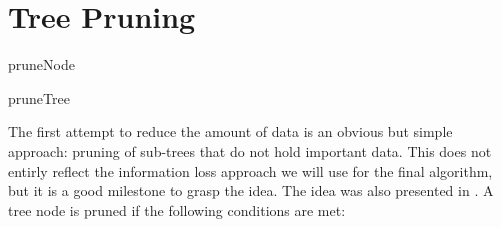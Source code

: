 \section{Tree Pruning}
\label{sec:algorithm:pruning}

\begin{algorithm}



    \caption{pruneNode}
    \label{algo:pruneNode}
\end{algorithm}

\begin{algorithm}



    \caption{pruneTree}
    \label{algo:pruneTree}
\end{algorithm}

The first attempt to reduce the amount of data is an obvious but simple approach: pruning of sub-trees that do not hold important data. This does not entirly reflect the information loss approach we will use for the final algorithm, but it is a good milestone to grasp the idea. The idea was also presented in \cite{RACE}. A tree node is pruned if the following conditions are met:

